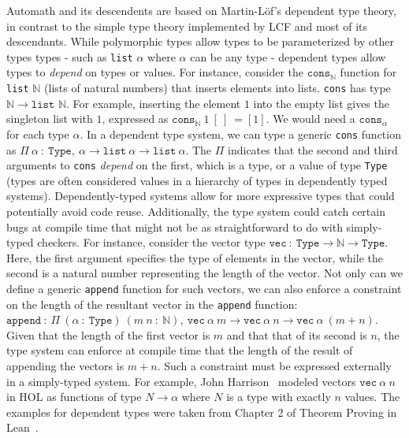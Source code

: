 \documentclass{article}
\begin{document}
  	Automath and its descendents are 
  	based on Martin-L\"{o}f's dependent 
  	type theory, in contrast to the
  	simple type theory implemented by  
  	LCF and most of	its descendants. 
  	While polymorphic 
  	types allow types to be 
  	parameterized by other types 
  	types - such as \texttt{list}
  	$ \alpha$ where $\alpha$ can be 
  	any type - dependent types allow 
  	types to \textit{depend} on 
  	types or values. For instance, 
  	consider the 
  	$\texttt{cons}_{\mathbb{N}}$
  	function for \texttt{list} 
  	$\mathbb{N}$ (lists of natural 
  	numbers) that inserts elements into 
  	lists. \texttt{cons} has type 
  	$\mathbb{N}	\to \texttt{list } 
  	\mathbb{N}$. For example, 
  	inserting the element $1$ into 
  	the empty list gives the 
  	singleton list with $1$, expressed
  	as $\texttt{cons}_{\mathbb{N}}\ 
  	1\ [\ ]\ = [1]$. We would need 
  	a $\texttt{cons}_{\alpha}$ for 
  	each type $\alpha$. In a 
  	dependent type system, we can 
  	type a generic \texttt{cons} 
  	function as $\Pi\ \alpha\ :\ 
  	\texttt{Type},\ \alpha \to 
  	\texttt{list}\ \alpha \to 
  	\texttt{list}\ \alpha$. The 
  	$\Pi$ indicates that the 
  	second and third arguments 
  	to \texttt{cons} \textit{depend}
  	on the first, which is a type, 
  	or a value of type \texttt{Type} 
  	(types are often considered 
  	values in a hierarchy
  	of types in dependently typed 
  	systems). Dependently-typed 
  	systems allow for more expressive
  	types that could potentially 
  	avoid code reuse. Additionally, 
  	the type system could catch 
  	certain bugs at compile time
  	that might not be as 
  	straightforward to do with 
  	simply-typed checkers. For 
  	instance, consider the 
  	vector type $\texttt{vec}\ 
  	:\ \texttt{Type} \to \mathbb{N}
  	\to \texttt{Type}$. Here, the 
  	first argument specifies the 
  	type of elements in the vector, 
  	while the second is a natural 
  	number representing the 
  	length of the vector. Not 
  	only can we define a generic
  	\texttt{append} function for 
  	such vectors, we can also 
  	enforce a constraint on the 
  	length of the resultant vector
  	in the \texttt{append} function:
  	$\texttt{append}\ :\ \Pi\ 
  	(\alpha\ :\ \texttt{Type})\ 
  	(m\ n\ :\ \mathbb{N}),\ 
  	\texttt{vec}\ \alpha\ m \to 
  	\texttt{vec}\ \alpha\ n \to 
  	\texttt{vec}\ \alpha\ (m + n)$.
  	Given that the length of the 
  	first vector is $m$ and that 
  	that of its	second is $n$, the 
  	type system	can enforce at compile 
  	time that the length of the result 
  	of appending the vectors is 
  	$m + n$. Such a constraint 
  	must be expressed externally 
  	in a simply-typed system. For 
  	example, John 
  	Harrison~\cite{10.1007/11541868_8} 
  	modeled vectors $\texttt{vec}\ 
  	\alpha\ n$ in HOL as functions 
  	of type	$N \to \alpha$ where $N$ 
  	is a type with exactly $n$ values. 
  	The examples for dependent 
  	types were taken from 
  	Chapter 2 of Theorem Proving 
  	in Lean~\cite{avigad2016theorem}.
  
\end{document}
